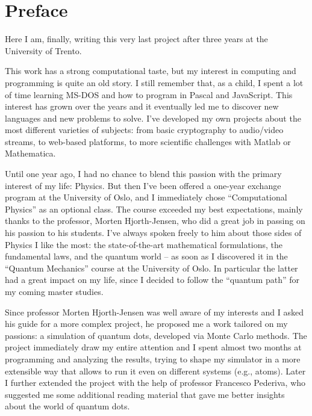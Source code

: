 
\chapter{Preface}

Here I am, finally, writing this very last project after three years at the University of Trento.

This work has a strong computational taste, but my interest in computing and programming is quite an old story. I still remember that, as a child, I spent a lot of time learning MS-DOS and how to program in Pascal and JavaScript. This interest has grown over the years and it eventually led me to discover new languages and new problems to solve. I've developed my own projects about the most different varieties of subjects: from basic cryptography to audio/video streams, to web-based platforms, to more scientific challenges with Matlab or Mathematica.

Until one year ago, I had no chance to blend this passion with the primary interest of my life: Physics. But then I've been offered a one-year exchange program at the University of Oslo, and I immediately chose ``Computational Physics'' as an optional class. The course exceeded my best expectations, mainly thanks to the professor, Morten Hjorth-Jensen, who did a great job in passing on his passion to his students. I've always spoken freely to him about those sides of Physics I like the most: the state-of-the-art mathematical formulations, the fundamental laws, and the quantum world -- as soon as I discovered it in the ``Quantum Mechanics'' course at the University of Oslo. In particular the latter had a great impact on my life, since I decided to follow the ``quantum path'' for my coming master studies.

Since professor Morten Hjorth-Jensen was well aware of my interests and I asked his guide for a more complex project, he proposed me a work tailored on my passions: a simulation of quantum dots, developed via Monte Carlo methods. The project immediately draw my entire attention and I spent almost two months at programming and analyzing the results, trying to shape my simulator in a more extensible way that allows to run it even on different systems (e.g., atoms). Later I further extended the project with the help of professor Francesco Pederiva, who suggested me some additional reading material that gave me better insights about the world of quantum dots.

